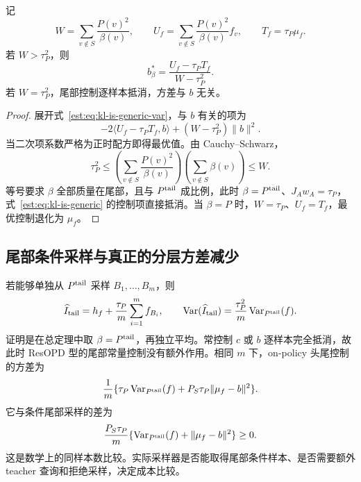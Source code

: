 \begin{proposition}[任意采样测度下的最优尾部常控制]
记
\begin{equation*}
 W=\sum_{v\notin S}\frac{P(v)^2}{\beta(v)},\qquad
 U_f=\sum_{v\notin S}\frac{P(v)^2}{\beta(v)}f_v,\qquad T_f=\tau_P\mu_f.
\end{equation*}
若 $W>\tau_P^2$，则
\begin{equation*}
 b_\beta^*=\frac{U_f-\tau_PT_f}{W-\tau_P^2}.
\end{equation*}
若 $W=\tau_P^2$，尾部控制逐样本抵消，方差与 $b$ 无关。
\end{proposition}
\begin{proof}
展开式~\eqref{est:eq:kl-is-generic-var}，与 $b$ 有关的项为
\begin{equation*}
 -2\langle U_f-\tau_PT_f,b\rangle+(W-\tau_P^2)\|b\|^2.
\end{equation*}
当二次项系数严格为正时配方即得最优值。由 Cauchy--Schwarz，
\begin{equation*}
 \tau_P^2
 \le\left(\sum_{v\notin S}\frac{P(v)^2}{\beta(v)}\right)
      \left(\sum_{v\notin S}\beta(v)\right)\le W.
\end{equation*}
等号要求 $\beta$ 全部质量在尾部，且与 $P^{\mathrm{tail}}$ 成比例，此时 $\beta=P^{\mathrm{tail}}$、$J_Aw_A=\tau_P$，式~\eqref{est:eq:kl-is-generic} 的控制项直接抵消。当 $\beta=P$ 时，$W=\tau_P$、$U_f=T_f$，最优控制退化为 $\mu_f$。
\end{proof}

\subsection{尾部条件采样与真正的分层方差减少}
若能够单独从 $P^{\mathrm{tail}}$ 采样 $B_1,\ldots,B_m$，则
\begin{equation*}
 \widehat I_{\mathrm{tail}}=h_f+\frac{\tau_P}{m}\sum_{i=1}^m f_{B_i},
 \qquad
 \operatorname{Var}(\widehat I_{\mathrm{tail}})=\frac{\tau_P^2}{m}\operatorname{Var}_{P^{\mathrm{tail}}}(f).
\end{equation*}
证明是在总定理中取 $\beta=P^{\mathrm{tail}}$，再独立平均。常控制 $c$ 或 $b$ 逐样本完全抵消，故此时 ResOPD 型的尾部常量控制没有额外作用。相同 $m$ 下，on-policy 头尾控制的方差为
\begin{equation*}
 \frac1m\{\tau_P\operatorname{Var}_{P^{\mathrm{tail}}}(f)+P_S\tau_P\|\mu_f-b\|^2\}.
\end{equation*}
它与条件尾部采样的差为
\begin{equation*}
 \frac{P_S\tau_P}{m}\{\operatorname{Var}_{P^{\mathrm{tail}}}(f)+\|\mu_f-b\|^2\}\ge0.
\end{equation*}
这是数学上的同样本数比较。实际采样器是否能取得尾部条件样本、是否需要额外 teacher 查询和拒绝采样，决定成本比较。

